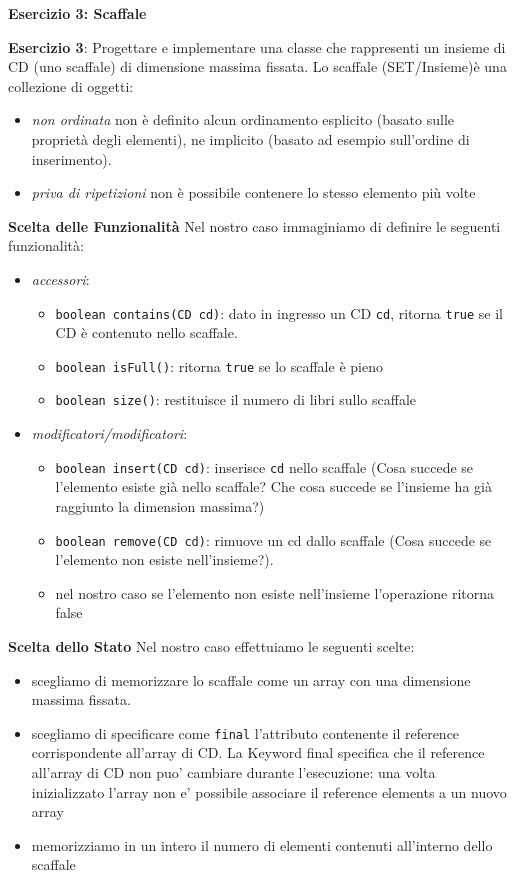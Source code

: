 \documentclass{article}
\begin{document}
\textbf{Esercizio 3: Scaffale}
\begin{framed}
\textbf{Esercizio 3}: Progettare e implementare una classe che rappresenti un insieme di CD (uno scaffale) di dimensione massima fissata. Lo scaffale (SET/Insieme)\`e una collezione di oggetti:
\begin{itemize}
	\item \emph{non ordinata} non è definito alcun ordinamento esplicito (basato sulle proprietà degli elementi),
	ne implicito (basato ad esempio sull'ordine di inserimento).
	\item \emph{priva di ripetizioni} non è possibile contenere lo stesso elemento più volte
\end{itemize}
\end{framed}

\textbf{Scelta delle Funzionalit\`a}
Nel nostro caso immaginiamo di definire le seguenti funzionalit\`a:
\begin{itemize}
\item \emph{accessori}:
\begin{itemize}
\item \texttt{boolean contains(CD cd)}: dato in ingresso un CD \texttt{cd}, ritorna \texttt{true} se il CD è contenuto nello scaffale.
\item \texttt{boolean isFull()}: ritorna \texttt{true} se lo scaffale \`e pieno
\item \texttt{boolean size()}: restituisce il numero di libri sullo scaffale
\end{itemize}
\item \emph{modificatori/modificatori}:
\begin{itemize}
\item  \texttt{boolean insert(CD cd)}: inserisce \texttt{cd} nello scaffale (Cosa succede se l'elemento esiste gi\`a nello scaffale? Che cosa succede se l'insieme ha gi\`a raggiunto la dimension massima?)
\item \texttt{boolean remove(CD cd)}: rimuove un cd dallo scaffale (Cosa succede se l'elemento non esiste  nell'insieme?).
\item nel nostro caso se l'elemento non esiste nell'insieme l'operazione ritorna false
\end{itemize}
\end{itemize}


\textbf{Scelta dello Stato}
Nel nostro caso effettuiamo le seguenti scelte:
\begin{itemize}
\item scegliamo di memorizzare lo scaffale come un array con una dimensione massima fissata.
\item scegliamo di specificare come \texttt{final} l'attributo contenente il reference corrispondente all'array di CD. La Keyword final specifica che il reference all'array di CD non puo' cambiare durante l'esecuzione: una volta inizializzato l'array non e' possibile associare il reference elements a un nuovo array 
\item memorizziamo in un intero il numero di elementi contenuti all'interno dello scaffale
\end{itemize}
\end{document}
